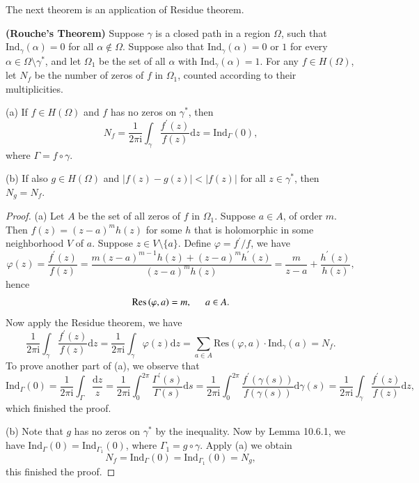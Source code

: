 The next theorem is an application of Residue theorem.
\begin{theorem}{\textbf{(Rouche's Theorem)}}
Suppose $\gamma$ is a closed path in a region $\Omega$, such that $\mathrm{Ind}_\gamma(\alpha)=0$ for all $\alpha\notin\Omega$. Suppose also that $\mathrm{Ind}_\gamma(\alpha)=0$ or $1$ for every $\alpha\in\Omega\setminus\gamma^*$, and let $\Omega_1$ be the set of all $\alpha$ with $\mathrm{Ind}_\gamma(\alpha)=1$. For any $f\in H(\Omega)$, let $N_f$ be the number of zeros of $f$ in $\Omega_1$, counted according to their multiplicities.\par
(a) If $f\in H(\Omega)$ and $f$ has no zeros on $\gamma^*$, then 
$$
N_f=\frac{1}{2\pi \mathrm{i}}\int_{\gamma}{\frac{f^{\prime}\left( z \right)}{f\left( z \right)}\mathrm{d}z}=\mathrm{Ind}_{\Gamma}\left( 0 \right) ,
$$
where $\Gamma=f\circ\gamma$.\par
(b) If also $g\in H(\Omega)$ and $|f(z)-g(z)|<|f(z)|$ for all $z\in\gamma^*$, then $N_g=N_f$.
\end{theorem}
\begin{proof}
(a) Let $A$ be the set of all zeros of $f$ in $\Omega_1$. Suppose $a\in A$, of order $m$. Then $f(z)=(z-a)^mh(z)$ for some $h$ that is holomorphic in some neighborhood $V$ of $a$. Suppose $z\in V\setminus\{a\}$. Define $\varphi=f^\prime/f$, we have 
$$
\varphi \left( z \right) =\frac{f^{\prime}\left( z \right)}{f\left( z \right)}=\frac{m\left( z-a \right) ^{m-1}h\left( z \right) +\left( z-a \right) ^mh^{\prime}\left( z \right)}{\left( z-a \right) ^mh\left( z \right)}=\frac{m}{z-a}+\frac{h^{\prime}\left( z \right)}{h\left( z \right)},
$$
hence 
$$
\mathrm{Res}\left( \varphi ,a \right) =m,\hspace{0.5cm}a\in A.
$$
Now apply the Residue theorem, we have 
$$
\frac{1}{2\pi \mathrm{i}}\int_{\gamma}{\frac{f^{\prime}\left( z \right)}{f\left( z \right)}\mathrm{d}z}=\frac{1}{2\pi \mathrm{i}}\int_{\gamma}{\varphi \left( z \right) \mathrm{d}z}=\sum_{a\in A}{\mathrm{Res}\left( \varphi ,a \right) \cdot \mathrm{Ind}_{\gamma}\left( a \right)}=N_f.
$$
To prove another part of (a), we observe that 
$$
\mathrm{Ind}_{\Gamma}\left( 0 \right) =\frac{1}{2\pi \mathrm{i}}\int_{\Gamma}{\frac{\mathrm{d}z}{z}}=\frac{1}{2\pi \mathrm{i}}\int_0^{2\pi}{\frac{\Gamma ^{\prime}\left( s \right)}{\Gamma \left( s \right)}\mathrm{d}s}=\frac{1}{2\pi \mathrm{i}}\int_0^{2\pi}{\frac{f^{\prime}\left( \gamma \left( s \right) \right)}{f\left( \gamma \left( s \right) \right)}\mathrm{d}\gamma \left( s \right)}=\frac{1}{2\pi \mathrm{i}}\int_{\gamma}{\frac{f^{\prime}\left( z \right)}{f\left( z \right)}\mathrm{d}z},
$$
which finished the proof.\par
(b) Note that $g$ has no zeros on $\gamma^*$ by the inequality. Now by Lemma 10.6.1, we have $\mathrm{Ind}_\Gamma(0)=\mathrm{Ind}_{\Gamma_1}(0)$, where $\Gamma_1=g\circ\gamma$. Apply (a) we obtain 
$$
N_f=\mathrm{Ind}_{\Gamma}\left( 0 \right) =\mathrm{Ind}_{\Gamma _1}\left( 0 \right) =N_g,
$$
this finished the proof.
\end{proof}
